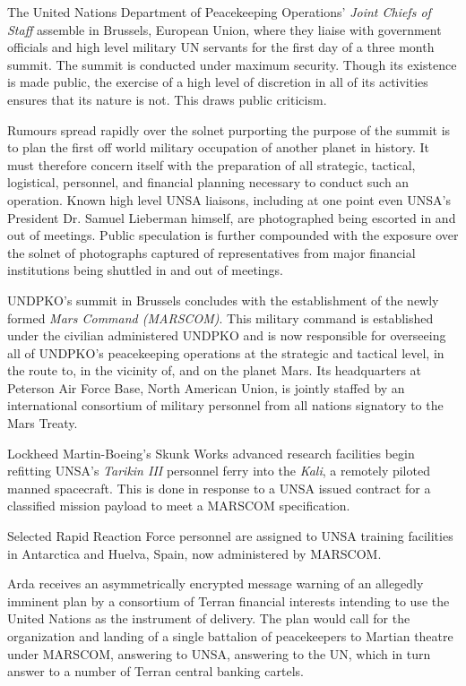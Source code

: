 The United Nations Department of Peacekeeping Operations' {\it Joint Chiefs of Staff} assemble in Brussels, European Union, where they liaise with government officials and high level military UN servants for the first day of a three month summit. The summit is conducted under maximum security. Though its existence is made public, the exercise of a high level of discretion in all of its activities ensures that its nature is not. This draws public criticism.

Rumours spread rapidly over the solnet purporting the purpose of the summit is to plan the first off world military occupation of another planet in history. It must therefore concern itself with the preparation of all strategic, tactical, logistical, personnel, and financial planning necessary to conduct such an operation. Known high level UNSA liaisons, including at one point even UNSA's President Dr. Samuel Lieberman himself, are photographed being escorted in and out of meetings. Public speculation is further compounded with the exposure over the solnet of photographs captured of representatives from major financial institutions being shuttled in and out of meetings.
\StopTimelineDate

UNDPKO's summit in Brussels concludes with the establishment of the newly formed {\it Mars Command (MARSCOM)}. This military command is established under the civilian administered UNDPKO and is now responsible for overseeing all of UNDPKO's peacekeeping operations at the strategic and tactical level, in the route to, in the vicinity of, and on the planet Mars. Its headquarters at Peterson Air Force Base, North American Union, is jointly staffed by an international consortium of military personnel from all nations signatory to the Mars Treaty.
\StopTimelineDate

Lockheed Martin-Boeing's Skunk Works advanced research facilities begin refitting UNSA's {\it Tarikin III} personnel ferry into the {\it Kali}, a remotely piloted manned spacecraft. This is done in response to a UNSA issued contract for a classified mission payload to meet a MARSCOM specification.
\StopTimelineDate

Selected Rapid Reaction Force personnel are assigned to UNSA training facilities in Antarctica and Huelva, Spain, now administered by MARSCOM.
\StopTimelineDate

Arda receives an asymmetrically encrypted message warning of an allegedly imminent plan by a consortium of Terran financial interests intending to use the United Nations as the instrument of delivery. The plan would call for the organization and landing of a single battalion of peacekeepers to Martian theatre under MARSCOM, answering to UNSA, answering to the UN, which in turn answer to a number of Terran central banking cartels.

